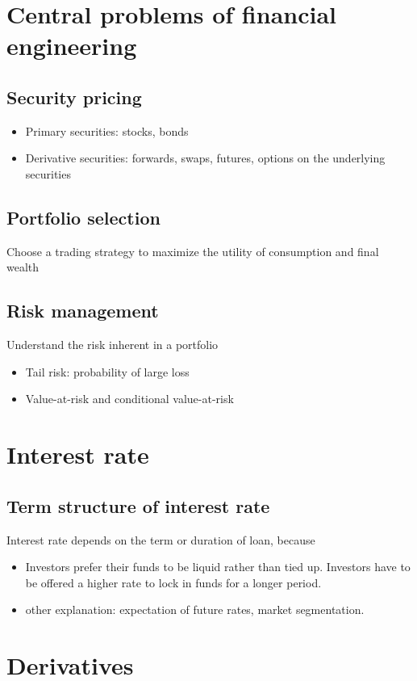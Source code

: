 \documentclass[a4paper,13pt]{report}
\begin{document}
\section{Central problems of financial engineering}
\subsection{Security pricing}
\begin{itemize}
    \item Primary securities: stocks, bonds
    \item Derivative securities: forwards, swaps, futures, options on the underlying securities
\end{itemize}
\subsection{Portfolio selection}
Choose a trading strategy to maximize the utility of consumption and final wealth

\subsection{Risk management}
Understand the risk inherent in a portfolio
\begin{itemize}
    \item Tail risk: probability of large loss
    \item Value-at-risk and conditional value-at-risk
\end{itemize}


\section{Interest rate}
\subsection{Term structure of interest rate}
Interest rate depends on the term or duration of loan, because
\begin{itemize}
    \item Investors prefer their funds to be liquid rather than tied up. Investors have to be offered a higher rate to lock in funds for a longer period.
    \item other explanation: expectation of future rates, market segmentation.
\end{itemize}


\section{Derivatives}
\end{document}
